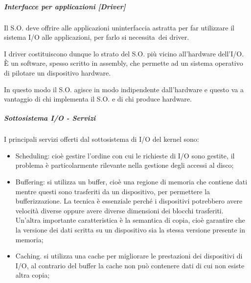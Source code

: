 \documentclass[
]{article}
\providecommand{\tightlist}{%
  \setlength{\itemsep}{0pt}\setlength{\parskip}{0pt}}
\begin{document}
{}

{}

\subparagraph{\texorpdfstring{{Interfacce per applicazioni
{[}Driver{]}}}{Interfacce per applicazioni {[}Driver{]}}}\label{h.vg3m2ua8rch4}

{Il S.O. deve offrire alle applicazioni un\textquotesingle interfaccia
astratta per far utilizzare il sistema I/O alle applicazioni, per farlo
si }{necessita}{~dei driver.}

{}

{I driver costituiscono dunque lo strato del S.O. più vicino
all'hardware dell'I/O. È un software, spesso scritto in assembly, che
permette ad un sistema operativo di pilotare un dispositivo hardware.}

{In questo modo il S.O. agisce in modo indipendente dall'hardware e
questo va a vantaggio di chi implementa il S.O. e di chi produce
hardware.}

{}

\subparagraph{\texorpdfstring{{Sottosistema I/O -
Servizi}}{Sottosistema I/O - Servizi}}\label{h.2chjezwgprj}

{I principali servizi offerti dal sottosistema di I/O del kernel sono:}

{}

\begin{itemize}
\tightlist
\item
  {Scheduling}{: cioè gestire l'ordine con cui le richieste di I/O sono
  gestite, il problema è particolarmente rilevante nella gestione degli
  accessi al disco;}
\end{itemize}

{}

\begin{itemize}
\tightlist
\item
  {Buffering}{: si utilizza un buffer, cioè una regione di memoria che
  contiene dati mentre questi sono trasferiti da un dispositivo, per
  permettere la bufferizzazione. La tecnica è essenziale perché i
  dispositivi potrebbero avere velocità diverse oppure avere diverse
  dimensioni dei blocchi trasferiti. Un'altra importante caratteristica
  è la semantica di copia, cioè garantire che la versione dei dati
  scritta su un dispositivo sia la stessa versione presente in memoria;}
\end{itemize}

{}

\begin{itemize}
\tightlist
\item
  {Caching}{. si utilizza una cache per migliorare le prestazioni dei
  dispositivi di I/O, al contrario del buffer la cache non può contenere
  dati di cui non esiste altra copia;}
\end{itemize}
\end{document}
